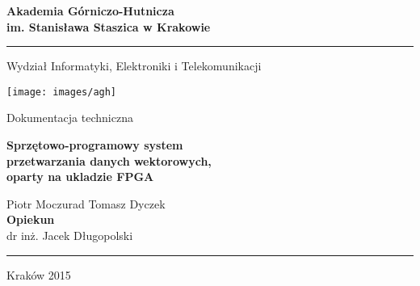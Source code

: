 \begin{titlepage}
    \begin{center}
		\fontsize{17pt}{20pt}\selectfont
        \textbf{Akademia Górniczo-Hutnicza\\im. Stanisława Staszica w Krakowie}
        \rule{\textwidth}{1.5pt}\par
        \vspace{0.5cm}
        Wydział Informatyki, Elektroniki i Telekomunikacji
        
        \vspace{1.5cm}

        \texttt{[image: images/agh]}
 		
 		\vspace{1.5cm}
 		
 		Dokumentacja techniczna
 		
 		\vspace{0.5cm}
	 	\textbf{Sprzętowo-programowy system\\przetwarzania danych wektorowych,\\oparty na ukladzie FPGA}
		
		Piotr Moczurad
		Tomasz Dyczek
		\vspace{1.5cm}\\
		\textbf{Opiekun}\\
		dr inż. Jacek Długopolski
		\rule{\textwidth}{1.5pt}\par
		Kraków 2015
		
        
    \end{center}
\end{titlepage}